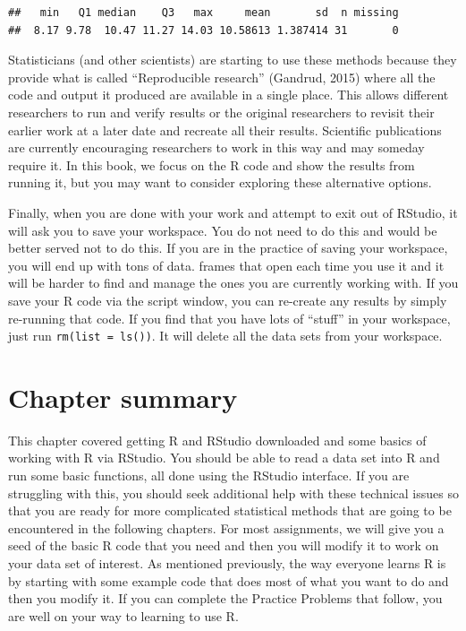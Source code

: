 \documentclass[]{book}
\newenvironment{Shaded}{\begin{snugshade}}{\end{snugshade}}
\newcommand{\KeywordTok}[1]{\textcolor[rgb]{0.13,0.29,0.53}{\textbf{#1}}}
\newcommand{\OperatorTok}[1]{\textcolor[rgb]{0.81,0.36,0.00}{\textbf{#1}}}
\newcommand{\NormalTok}[1]{#1}
\begin{document}
\begin{Shaded}
\end{Shaded}

\begin{verbatim}
##   min   Q1 median    Q3   max     mean       sd  n missing
##  8.17 9.78  10.47 11.27 14.03 10.58613 1.387414 31       0
\end{verbatim}

Statisticians (and other scientists) are starting to use these methods
because they provide what is called ``Reproducible research'' (Gandrud,
2015) where all the code and output it produced are available in a
single place. This allows different researchers to run and verify
results or the original researchers to revisit their earlier work at a
later date and recreate all their results. Scientific publications are
currently encouraging researchers to work in this way and may someday
require it. In this book, we focus on the R code and show the results
from running it, but you may want to consider exploring these
alternative options.

Finally, when you are done with your work and attempt to exit out of
RStudio, it will ask you to save your workspace. You do not need to do
this and would be better served not to do this. If you are in the
practice of saving your workspace, you will end up with tons of data.
frames that open each time you use it and it will be harder to find and
manage the ones you are currently working with. If you save your R code
via the script window, you can re-create any results by simply
re-running that code. If you find that you have lots of ``stuff'' in
your workspace, just run \texttt{rm(list\ =\ ls())}. It will delete all
the data sets from your workspace.

\section{Chapter summary}\label{chapter-summary}

This chapter covered getting R and RStudio downloaded and some basics of
working with R via RStudio. You should be able to read a data set into R
and run some basic functions, all done using the RStudio interface. If
you are struggling with this, you should seek additional help with these
technical issues so that you are ready for more complicated statistical
methods that are going to be encountered in the following chapters. For
most assignments, we will give you a seed of the basic R code that you
need and then you will modify it to work on your data set of interest.
As mentioned previously, the way everyone learns R is by starting with
some example code that does most of what you want to do and then you
modify it. If you can complete the Practice Problems that follow, you
are well on your way to learning to use R.
\end{document}
